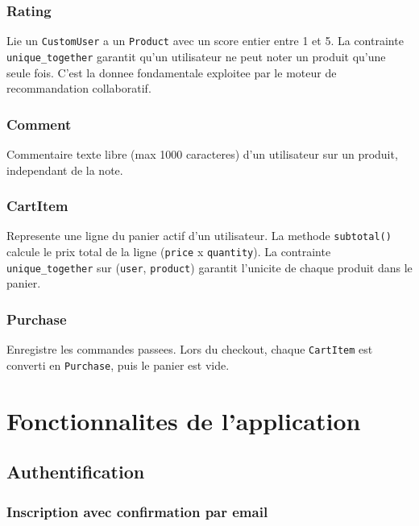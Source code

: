 \documentclass[12pt,a4paper]{report}
\newcommand{\fonction}[1]{\texttt{#1()}}
\newcommand{\classe}[1]{\texttt{#1}}
\newcommand{\var}[1]{\texttt{#1}}
\begin{document}
\subsection{Rating}

Lie un \classe{CustomUser} a un \classe{Product} avec un score entier entre 1
et 5. La contrainte \var{unique\_together} garantit qu'un utilisateur ne peut
noter un produit qu'une seule fois. C'est la donnee fondamentale exploitee par
le moteur de recommandation collaboratif.

\subsection{Comment}

Commentaire texte libre (max 1000 caracteres) d'un utilisateur sur un produit,
independant de la note.

\subsection{CartItem}

Represente une ligne du panier actif d'un utilisateur. La methode
\fonction{subtotal} calcule le prix total de la ligne
(\var{price} x \var{quantity}). La contrainte \var{unique\_together} sur
(\var{user}, \var{product}) garantit l'unicite de chaque produit dans le panier.

\subsection{Purchase}

Enregistre les commandes passees. Lors du checkout, chaque \classe{CartItem}
est converti en \classe{Purchase}, puis le panier est vide.

\chapter{Fonctionnalites de l'application}

\section{Authentification}

\subsection{Inscription avec confirmation par email}
\end{document}
